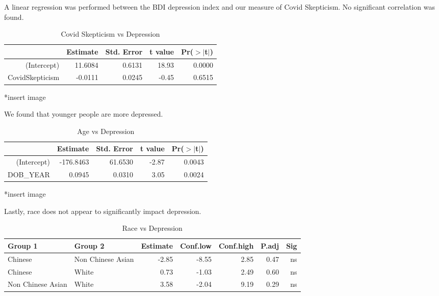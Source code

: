 \documentclass{article}
\begin{document}
\bigskip
\noindent
A linear regression was performed between the BDI depression index and our measure of Covid Skepticism. No significant correlation was found.

\begin{table}[ht]
\centering
\caption{Covid Skepticism vs Depression} \label{tab:title}
\begin{tabular}{rrrrr}
  \hline
 & Estimate & Std. Error & t value & Pr($>$$|$t$|$) \\ 
  \hline
(Intercept) & 11.6084 & 0.6131 & 18.93 & 0.0000 \\ 
  CovidSkepticism & -0.0111 & 0.0245 & -0.45 & 0.6515 \\ 
   \hline
\end{tabular}
\end{table}

*insert image

\pagebreak
\noindent

We found that younger people are more depressed.

\begin{table}[ht]
\centering
\caption{Age vs Depression} \label{tab:title}
\begin{tabular}{rrrrr}
  \hline
 & Estimate & Std. Error & t value & Pr($>$$|$t$|$) \\ 
  \hline
(Intercept) & -176.8463 & 61.6530 & -2.87 & 0.0043 \\ 
  DOB\_YEAR & 0.0945 & 0.0310 & 3.05 & 0.0024 \\ 
   \hline
\end{tabular}
\end{table}
*insert image

\bigskip
\bigskip
\noindent
Lastly, race does not appear to significantly impact depression. 

\begin{table}[ht]
\centering
\caption{Race vs Depression} \label{tab:title}
\begin{tabular}{llrrrrr}
  \hline
Group 1 & Group 2 & Estimate & Conf.low & Conf.high & P.adj & Sig \\ 
  \hline
Chinese & Non Chinese Asian & -2.85 & -8.55 & 2.85 & 0.47 & ns \\ 
Chinese & White & 0.73 & -1.03 & 2.49 & 0.60 & ns \\ 
Non Chinese Asian & White & 3.58 & -2.04 & 9.19 & 0.29 & ns \\ 
   \hline
\end{tabular}
\end{table}
\end{document}
